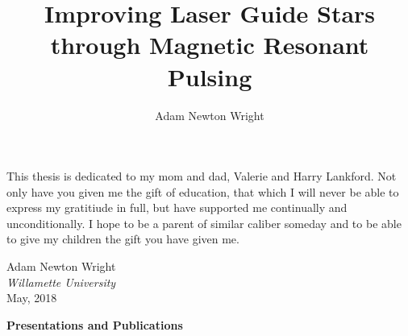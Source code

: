 \documentclass[12pt]{report}
\begin{document}
\title{Improving Laser Guide Stars through Magnetic Resonant Pulsing}
\author{Adam Newton Wright}

\maketitle
%

\newpage
\vspace*{\fill}

This thesis is dedicated to my mom and dad, Valerie and Harry Lankford. Not only have you given me the gift of education, that which I will never be able to express my gratitiude in full, but have supported me continually and unconditionally. I hope to be a parent of similar caliber someday and to be able to give my children the gift you have given me.

\begin{flushright}
Adam Newton Wright\\
\textit{Willamette University}\\
May, 2018
\end{flushright}


\vspace*{\fill}

\newpage




\begin{center}
\textbf{Presentations and Publications}\\
\end{center}
\end{document}

